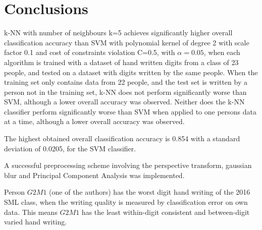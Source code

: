 \section{Conclusions}
\label{sec:conclusion}
k-NN with number of neighbours k=5 achieves significantly higher overall 
classification accuracy than SVM with polynomial kernel of degree 2
with scale factor 0.1 and cost of constraints violation C=0.5,
with \(\alpha=0.05\),
when each algorithm is trained with a dataset of hand written digits
from a class of 23 people, and tested on a dataset
with digits written by the same people.
When the training set only contains data from 22 people,
and the test set is written by a person not in the training
set, k-NN does not perform significantly worse
than SVM, although a lower overall accuracy was observed.
Neither does the k-NN classifier perform significantly worse than SVM
when applied to one persons data at a time,
although a lower overall accuracy was observed.

The highest obtained overall classification accuracy is 0.854 with a standard
deviation of 0.0205, for the SVM classifier.

A successful preprocessing scheme involving the perspective transform,
gaussian blur and Principal Component Analysis was implemented.

Person \(G2M1\) (one of the authors) has the worst digit hand writing of the 2016 SML class,
when the writing quality is measured by classification
error on own data. This means \(G2M1\) has the least
within-digit consistent and between-digit varied
hand writing.